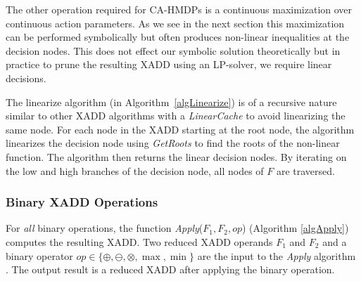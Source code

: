 \documentclass[twoside,11pt]{article}
\begin{document}
The other operation required for CA-HMDPs is a continuous maximization over continuous action parameters. As we see in the next section this maximization can be performed symbolically but often produces non-linear inequalities at the decision nodes. This does not effect our symbolic solution theoretically but in practice to prune the resulting XADD using an LP-solver, we require linear decisions. 

The linearize algorithm (in Algorithm~\ref{algLinearize}) is of a recursive nature similar to other XADD algorithms with a \emph{LinearCache} to avoid linearizing the same node. For each node in the XADD starting at the root node, the algorithm linearizes the decision node using \emph{GetRoots} to find the roots of the non-linear function. The algorithm then returns the linear decision nodes. By iterating on the low and high branches of the decision node, all nodes of $F$ are traversed.
%

\subsubsection{Binary XADD Operations}

For \emph{all} binary operations, the function \emph{Apply}($F_1,F_2,\mathit{op}$) (Algorithm \ref{algApply}) computes the resulting XADD. 
Two reduced XADD operands $F_1$ and $F_2$ and a binary operator $\mathit{op} \in \{ \oplus, \ominus, \otimes , \max , \min \} $ are the input to the \emph{Apply} algorithm . The output result is a reduced XADD after applying the binary operation. 
\end{document}
